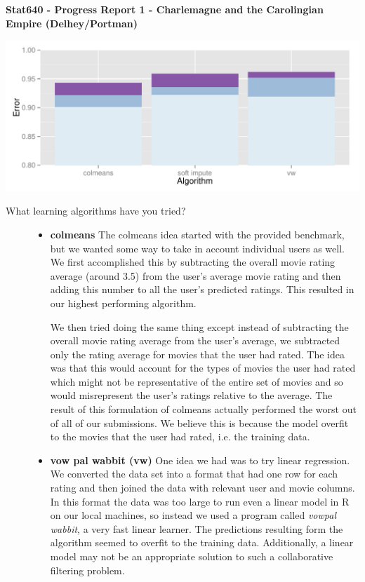 \documentclass[oneside]{article}
\begin{document}
\begin{center}
\textbf{Stat640 - Progress Report 1 - Charlemagne and the Carolingian Empire (Delhey/Portman)}
\end{center}

\begin{center}
  \includegraphics[width = 0.7\linewidth]{vis}
\end{center}

{\small
\begin{description}
\item[What learning algorithms have you tried?]
  \begin{itemize}

  \item \textbf{colmeans} The colmeans idea started with the provided benchmark, but we wanted some way to take in account individual users as well. We first accomplished this by subtracting the overall movie rating average (around 3.5) from the user's average movie rating and then adding this number to all the user's predicted ratings. This resulted in our highest performing algorithm. 

We then tried doing the same thing except instead of subtracting the overall movie rating average from the user's average, we subtracted only the rating average for movies that the user had rated. The idea was that this would account for the types of movies the user had rated which might not be representative of the entire set of movies and so would misrepresent the user's ratings relative to the average. The result of this formulation of colmeans actually performed the worst out of all of our submissions. We believe this is because the model overfit to the movies that the user had rated, i.e. the training data.

  \item \textbf{vow pal wabbit (vw)} One idea we had was to try linear regression. We converted the data set into a format that had one row for each rating and then joined the data with relevant user and movie columns. In this format the data was too large to run even a linear model in R on our local machines, so instead we used a program called \textit{vowpal wabbit}, a very fast linear learner. The predictions resulting form the algorithm seemed to overfit to the training data. Additionally, a linear model may not be an appropriate solution to such a collaborative filtering problem.


\end{itemize}
\end{description}}
\end{document}
